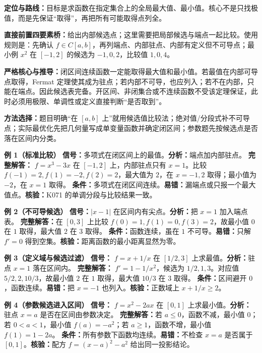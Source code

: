 \begin{knowledgeBox}
\textbf{定位与路线：}目标是求函数在指定集合上的全局最大值、最小值。核心不是只找极值，而是先保证“取得”，再把所有可能取得点列全。

\textbf{直接前置四要素桥：}给出内部候选点；这里需要把局部候选与端点一起比较。使用规则是：先确认 \(f\in C[a,b]\)，再列端点、内部驻点、内部有定义但不可导点；最小例 \(x^2\) 在 \([-1,2]\) 的候选为 \(-1,0,2\)，比较值 \(1,0,4\)。

\textbf{严格核心与推导：}闭区间连续函数一定能取得最大值和最小值。若最值在内部可导点取得，Fermat 定理使其成为驻点；若内部不可导，也应列入；若不在内部，只能在端点。因此候选表完备。开区间、非闭集合或不连续函数不受该定理保证，此时必须用极限、单调性或定义直接判断“是否取到”。

\textbf{方法选择：}题目明确“在 \([a,b]\) 上”就用候选值比较法；绝对值/分段式补不可导点；实际最优化先把几何量写成单变量函数并确定闭区间；参数题先按候选点是否落在区间内分类。

\textbf{例 1（标准比较）}\quad
\textbf{信号：}多项式在闭区间上的最值。\textbf{分析：}端点加内部驻点。
\textbf{完整解答：} \(f=x^3-3x\) 在 \([-1,2]\) 上，内部驻点只有 \(x=1\)。比较 \(f(-1)=2,f(1)=-2,f(2)=2\)，最大值为 \(2\)，在 \(x=-1,2\) 取得；最小值为 \(-2\)，在 \(x=1\) 取得。
\textbf{条件：}多项式在闭区间连续。\textbf{易错：}漏端点或只报一个最大值点。\textbf{核验：}K071 的单调分段与比较结果一致。

\textbf{例 2（不可导候选）}\quad
\textbf{信号：}\(|x-1|\) 在区间内有尖点。\textbf{分析：}把 \(x=1\) 加入端点表。
\textbf{完整解答：}在 \([0,3]\) 上比较 \(f(0)=1,f(1)=0,f(3)=2\)，故最小值 \(0\) 在 \(1\) 取得，最大值 \(2\) 在 \(3\) 取得。
\textbf{条件：}函数连续，虽在 \(1\) 不可导。\textbf{易错：}只解 \(f'=0\) 得到空集。\textbf{核验：}距离函数的最小距离显然为零。

\textbf{例 3（定义域与候选过滤）}\quad
\textbf{信号：} \(f=x+1/x\) 在 \([1/2,3]\) 上求最值。\textbf{分析：}驻点 \(x=1\) 落在区间内。
\textbf{完整解答：} \(f'=1-1/x^2\)，候选为 \(1/2,1,3\)。对应值 \(5/2,2,10/3\)，故最小值 \(2\) 在 \(1\) 取得，最大值 \(10/3\) 在 \(3\) 取得。
\textbf{条件：}区间避开 \(0\)，函数连续。\textbf{易错：}把 \(x=-1\) 也列入。\textbf{核验：}正数域上 \(x+1/x\ge2\)。

\textbf{例 4（参数候选进入区间）}\quad
\textbf{信号：} \(f=x^2-2ax\) 在 \([0,1]\) 上求最小值。\textbf{分析：}驻点 \(x=a\) 是否在区间由参数决定。
\textbf{完整解答：}若 \(a\le0\)，函数不减，最小值 \(0\)；若 \(0<a<1\)，最小值 \(f(a)=-a^2\)；若 \(a\ge1\)，函数不增，最小值 \(f(1)=1-2a\)。
\textbf{条件：}所有参数下函数均连续。\textbf{易错：}不检查 \(x=a\) 是否属于 \([0,1]\)。\textbf{核验：}配方 \(f=(x-a)^2-a^2\) 给出同一投影结论。


\end{knowledgeBox}
